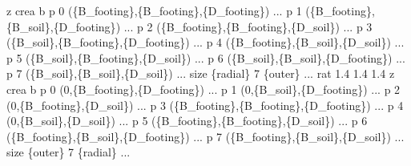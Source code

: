 \documentclass[a4paper, nobind]{templates/ociamthesis}
\newenvironment{Shaded}{\begin{snugshade}}{\end{snugshade}}
\newcommand{\SpecialCharTok}[1]{\textcolor[rgb]{0.00,0.00,0.00}{#1}}
\newcommand{\StringTok}[1]{\textcolor[rgb]{0.31,0.60,0.02}{#1}}
\renewenvironment{Shaded}
{
  \vspace{10pt}%
  \begin{snugshade}%
}{%
  \end{snugshade}%
  \vspace{8pt}%
}
\begin{document}
\begin{Shaded}
\begin{Highlighting}[]
\StringTok{z crea b p 0 (}\SpecialCharTok{\{B\_footing\}}\StringTok{,}\SpecialCharTok{\{B\_footing\}}\StringTok{,}\SpecialCharTok{\{D\_footing\}}\StringTok{) ...}
\StringTok{         p 1 (}\SpecialCharTok{\{B\_footing\}}\StringTok{,}\SpecialCharTok{\{B\_soil\}}\StringTok{,}\SpecialCharTok{\{D\_footing\}}\StringTok{) ...}
\StringTok{         p 2 (}\SpecialCharTok{\{B\_footing\}}\StringTok{,}\SpecialCharTok{\{B\_footing\}}\StringTok{,}\SpecialCharTok{\{D\_soil\}}\StringTok{) ...}
\StringTok{         p 3 (}\SpecialCharTok{\{B\_soil\}}\StringTok{,}\SpecialCharTok{\{B\_footing\}}\StringTok{,}\SpecialCharTok{\{D\_footing\}}\StringTok{) ...}
\StringTok{         p 4 (}\SpecialCharTok{\{B\_footing\}}\StringTok{,}\SpecialCharTok{\{B\_soil\}}\StringTok{,}\SpecialCharTok{\{D\_soil\}}\StringTok{) ...}
\StringTok{         p 5 (}\SpecialCharTok{\{B\_soil\}}\StringTok{,}\SpecialCharTok{\{B\_footing\}}\StringTok{,}\SpecialCharTok{\{D\_soil\}}\StringTok{) ...}
\StringTok{         p 6 (}\SpecialCharTok{\{B\_soil\}}\StringTok{,}\SpecialCharTok{\{B\_soil\}}\StringTok{,}\SpecialCharTok{\{D\_footing\}}\StringTok{) ...}
\StringTok{         p 7 (}\SpecialCharTok{\{B\_soil\}}\StringTok{,}\SpecialCharTok{\{B\_soil\}}\StringTok{,}\SpecialCharTok{\{D\_soil\}}\StringTok{) ...}
\StringTok{         size }\SpecialCharTok{\{radial\}}\StringTok{ 7 }\SpecialCharTok{\{outer\}}\StringTok{ ...}
\StringTok{         rat 1.4 1.4 1.4}
\StringTok{           }
\StringTok{z crea b p 0 (0,}\SpecialCharTok{\{B\_footing\}}\StringTok{,}\SpecialCharTok{\{D\_footing\}}\StringTok{) ...}
\StringTok{         p 1 (0,}\SpecialCharTok{\{B\_soil\}}\StringTok{,}\SpecialCharTok{\{D\_footing\}}\StringTok{) ...}
\StringTok{         p 2 (0,}\SpecialCharTok{\{B\_footing\}}\StringTok{,}\SpecialCharTok{\{D\_soil\}}\StringTok{) ...}
\StringTok{         p 3 (}\SpecialCharTok{\{B\_footing\}}\StringTok{,}\SpecialCharTok{\{B\_footing\}}\StringTok{,}\SpecialCharTok{\{D\_footing\}}\StringTok{) ...}
\StringTok{         p 4 (0,}\SpecialCharTok{\{B\_soil\}}\StringTok{,}\SpecialCharTok{\{D\_soil\}}\StringTok{) ...}
\StringTok{         p 5 (}\SpecialCharTok{\{B\_footing\}}\StringTok{,}\SpecialCharTok{\{B\_footing\}}\StringTok{,}\SpecialCharTok{\{D\_soil\}}\StringTok{) ...}
\StringTok{         p 6 (}\SpecialCharTok{\{B\_footing\}}\StringTok{,}\SpecialCharTok{\{B\_soil\}}\StringTok{,}\SpecialCharTok{\{D\_footing\}}\StringTok{) ...}
\StringTok{         p 7 (}\SpecialCharTok{\{B\_footing\}}\StringTok{,}\SpecialCharTok{\{B\_soil\}}\StringTok{,}\SpecialCharTok{\{D\_soil\}}\StringTok{) ...}
\StringTok{         size }\SpecialCharTok{\{outer\}}\StringTok{ 7 }\SpecialCharTok{\{radial\}}\StringTok{ ...}

\end{Highlighting}
\end{Shaded}
\end{document}
